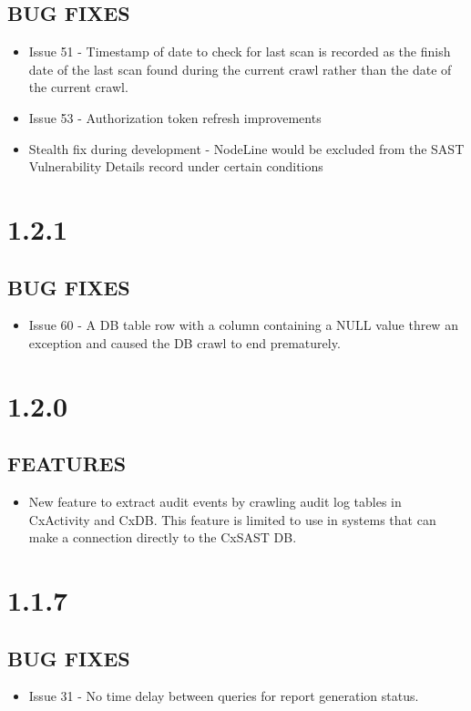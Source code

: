 \subsection*{BUG FIXES}
    \begin{itemize}
        \item Issue 51 - Timestamp of date to check for last scan is recorded as the finish date of the last scan found during the current crawl rather than the date of the current crawl.
        \item Issue 53 - Authorization token refresh improvements
        \item Stealth fix during development - NodeLine would be excluded from the SAST Vulnerability Details record under certain conditions 
    \end{itemize}


\section{1.2.1}
\subsection*{BUG FIXES}
    \begin{itemize}
        \item Issue 60 - A DB table row with a column containing a NULL value threw an exception and caused the DB crawl to end prematurely.
    \end{itemize}


\section{1.2.0}
\subsection*{FEATURES}
    \begin{itemize}
        \item New feature to extract audit events by crawling audit log tables in CxActivity and CxDB.  This feature is limited to use in systems that can make a connection directly to the CxSAST DB.
    \end{itemize}

\section{1.1.7}
\subsection*{BUG FIXES}
    \begin{itemize}
        \item Issue 31 - No time delay between queries for report generation status.
    \end{itemize}


